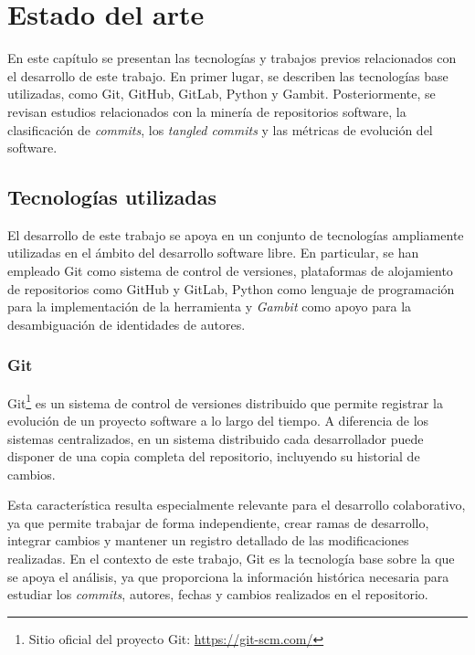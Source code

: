 \documentclass[a4paper, 12pt]{book}
\begin{document}
\cleardoublepage
\chapter{Estado del arte}
\label{chap:estado}

En este capítulo se presentan las tecnologías y trabajos previos relacionados con el desarrollo de este trabajo. En primer lugar, se describen las tecnologías base utilizadas, como Git, GitHub, GitLab, Python y Gambit. Posteriormente, se revisan estudios relacionados con la minería de repositorios software, la clasificación de \emph{commits}, los \emph{tangled commits} y las métricas de evolución del software.

\section{Tecnologías utilizadas}
\label{sec:tecnologias}

El desarrollo de este trabajo se apoya en un conjunto de tecnologías ampliamente utilizadas en el ámbito del desarrollo software libre. En particular, se han empleado Git como sistema de control de versiones, plataformas de alojamiento de repositorios como GitHub y GitLab, Python como lenguaje de programación para la implementación de la herramienta y \emph{Gambit} como apoyo para la desambiguación de identidades de autores.

\subsection{Git}
\label{subsec:git}

Git\footnote{Sitio oficial del proyecto Git: \url{https://git-scm.com/}} es un sistema de control de versiones distribuido que permite registrar la evolución de un proyecto software a lo largo del tiempo. A diferencia de los sistemas centralizados, en un sistema distribuido cada desarrollador puede disponer de una copia completa del repositorio, incluyendo su historial de cambios.

Esta característica resulta especialmente relevante para el desarrollo colaborativo, ya que permite trabajar de forma independiente, crear ramas de desarrollo, integrar cambios y mantener un registro detallado de las modificaciones realizadas. En el contexto de este trabajo, Git es la tecnología base sobre la que se apoya el análisis, ya que proporciona la información histórica necesaria para estudiar los \emph{commits}, autores, fechas y cambios realizados en el repositorio.
\end{document}
